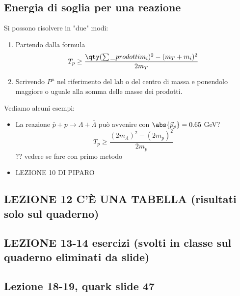 \subsection{Energia di soglia per una reazione} 
Si possono risolvere in "due" modi:
\begin{enumerate}
    \item Partendo dalla formula 
    \begin{equation*}
    T_p\geq \frac {\qty(\sum\_{prodotti}m_i)^2 - (m_T+m_i)^2} {2m_T}
    \end{equation*}
    \item Scrivendo $P^\mu$ nel riferimento del lab o del centro di massa e ponendolo maggiore o uguale alla somma delle masse dei prodotti.
\end{enumerate}
Vediamo alcuni esempi:
\begin{itemize}
    \item La reazione $\bar p + p\to \Lambda+\bar\Lambda$ può avvenire con $\abs{\vec p_p}=0.65$ GeV? 
    \begin{equation*}
    T_p\geq \frac {(2m_\Lambda)^2-(2m_p)^2} {2m_p}
    \end{equation*} ?? vedere se fare con primo metodo 
    \item LEZIONE 10 DI PIPARO
\end{itemize}
\subsection{LEZIONE 12 C'È UNA TABELLA (risultati solo sul quaderno)}
\subsection{LEZIONE 13-14 esercizi (svolti in classe sul quaderno eliminati da slide)}
\subsection{Lezione 18-19, quark slide 47}